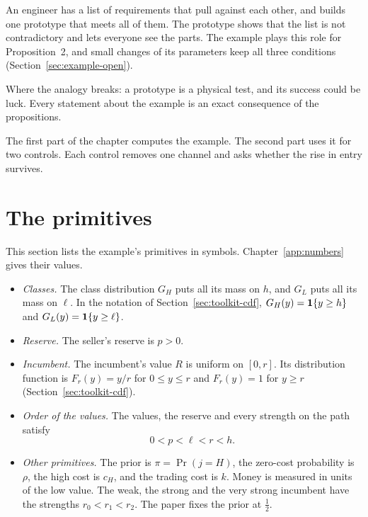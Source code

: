 \begin{analogy}[a prototype]
An engineer has a list of requirements that pull against each other, and builds one prototype that meets all of
them. The prototype shows that the list is not contradictory and lets everyone see the parts. The example plays
this role for Proposition~2, and small changes of its parameters keep all three conditions
(Section~\ref{sec:example-open}).

Where the analogy breaks: a prototype is a physical test, and its success could be luck. Every statement about the
example is an exact consequence of the propositions.
\end{analogy}

The first part of the chapter computes the example. The second part uses it for two controls. Each control removes
one channel and asks whether the rise in entry survives.

\section{The primitives}\label{sec:example-primitives}

This section lists the example's primitives in symbols. Chapter~\ref{app:numbers} gives their values.

\begin{itemize}
\item \emph{Classes.} The class distribution \(G_H\) puts all its mass on \(h\), and \(G_L\) puts all its mass on
  \(\ell\). In the notation of Section~\ref{sec:toolkit-cdf}, \(G_H(y)=\mathbf{1}\{y\ge h\}\) and \(G_L(y)=\mathbf{1}\{y\ge\ell\}\).
\item \emph{Reserve.} The seller's reserve is \(p>0\).
\item \emph{Incumbent.} The incumbent's value \(R\) is uniform on \([0,r]\). Its distribution function is
  \(F_r(y)=y/r\) for \(0\le y\le r\) and \(F_r(y)=1\) for \(y\ge r\) (Section~\ref{sec:toolkit-cdf}).
\item \emph{Order of the values.} The values, the reserve and every strength on the path satisfy
  \begin{equation}\label{eq:example-order}
  0<p<\ell<r<h.
  \end{equation}
\item \emph{Other primitives.} The prior is \(\pi=\Pr(j=H)\), the zero-cost probability is \(\rho\), the high cost
  is \(c_H\), and the trading cost is \(k\). Money is measured in units of the low value. The weak, the strong and
  the very strong incumbent have the strengths \(r_0<r_1<r_2\). The paper fixes the prior at \(\tfrac12\).
\end{itemize}

